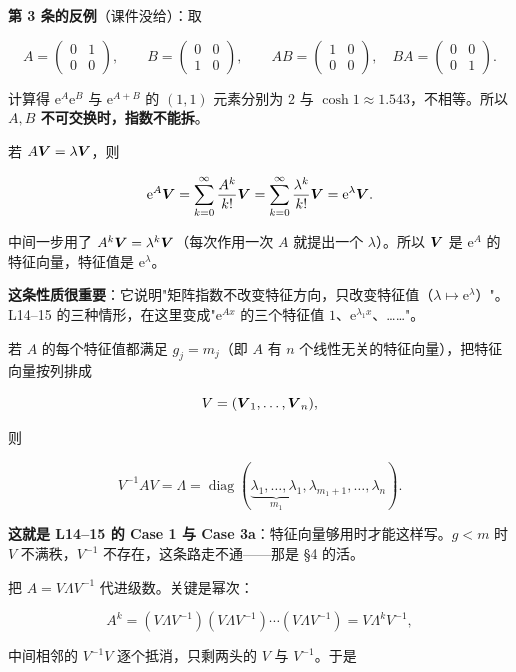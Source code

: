 \documentclass[11pt]{ctexart}
\newcommand{\mat}[1]{\begin{pmatrix}#1\end{pmatrix}}
\newcommand{\diag}{\operatorname{diag}}
\begin{document}
\textbf{第 3 条的反例}（课件没给）：取

\[
A=\mat{0&1\\0&0},\qquad B=\mat{0&0\\1&0},\qquad AB=\mat{1&0\\0&0},\quad BA=\mat{0&0\\0&1}.
\]

计算得 $\mathrm{e}^{A}\mathrm{e}^{B}$ 与 $\mathrm{e}^{A+B}$ 的 $(1,1)$ 元素分别为 $2$ 与 $\cosh1\approx1.543$，不相等。所以 \textbf{$A,B$ 不可交换时，指数不能拆}。


若 $A\boldsymbol{V}=\lambda\boldsymbol{V}$，则

\[
\mathrm{e}^{A}\boldsymbol{V}=\sum_{k=0}^{\infty}\frac{A^k}{k!}\boldsymbol{V}
=\sum_{k=0}^{\infty}\frac{\lambda^k}{k!}\boldsymbol{V}
=\mathrm{e}^{\lambda}\boldsymbol{V}.
\]

中间一步用了 $A^k\boldsymbol{V}=\lambda^k\boldsymbol{V}$（每次作用一次 $A$ 就提出一个 $\lambda$）。所以 $\boldsymbol{V}$ 是 $\mathrm{e}^{A}$ 的特征向量，特征值是 $\mathrm{e}^{\lambda}$。

\textbf{这条性质很重要}：它说明"矩阵指数不改变特征方向，只改变特征值（$\lambda\mapsto\mathrm{e}^{\lambda}$）"。L14--15 的三种情形，在这里变成"$\mathrm{e}^{Ax}$ 的三个特征值 $1$、$\mathrm{e}^{\lambda_1x}$、……"。



若 $A$ 的每个特征值都满足 $g_j=m_j$（即 $A$ 有 $n$ 个线性无关的特征向量），把特征向量按列排成

\[
V=(\boldsymbol{V}_1,\dots,\boldsymbol{V}_n),
\]

则

\[
V^{-1}AV=\Lambda=\diag(\underbrace{\lambda_1,\dots,\lambda_1}_{m_1},\lambda_{m_1+1},\dots,\lambda_n).
\]

\textbf{这就是 L14--15 的 Case 1 与 Case 3a}：特征向量够用时才能这样写。$g<m$ 时 $V$ 不满秩，$V^{-1}$ 不存在，这条路走不通——那是 §4 的活。


把 $A=V\Lambda V^{-1}$ 代进级数。关键是幂次：

\[
A^k=(V\Lambda V^{-1})(V\Lambda V^{-1})\cdots(V\Lambda V^{-1})=V\Lambda^kV^{-1},
\]

中间相邻的 $V^{-1}V$ 逐个抵消，只剩两头的 $V$ 与 $V^{-1}$。于是
\end{document}

